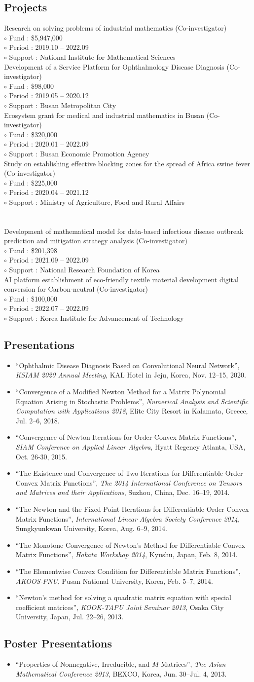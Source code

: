 \documentclass[11pt]{article} %
\newcommand\mypapers{
	
}
\newcommand\myprojseng{
	Research on solving problems of industrial mathematics (Co-investigator) \\
	$\circ$ Fund : \$5,947,000 \\
	$\circ$ Period : 2019.10 -- 2022.09 \\
	$\circ$ Support : National Institute for Mathematical Sciences \\
	
	Development of a Service Platform for Ophthalmology Disease Diagnosis (Co-investigator) \\
	$\circ$ Fund : \$98,000 \\
	$\circ$ Period : 2019.05 -- 2020.12 \\
	$\circ$ Support : Busan Metropolitan City \\
	
	Ecosystem grant for medical and industrial mathematics in Busan (Co-investigator) \\
	$\circ$ Fund : \$320,000 \\
	$\circ$ Period : 2020.01 -- 2022.09 \\
	$\circ$ Support : Busan Economic Promotion Agency \\
	
	Study on establishing effective blocking zones for the spread of Africa swine fever (Co-investigator) \\
	$\circ$ Fund : \$225,000 \\
	$\circ$ Period : 2020.04 -- 2021.12 \\
	$\circ$ Support : Ministry of Agriculture, Food and Rural Affairs \\
	~\\~\\
	
	Development of mathematical model for data-based infectious disease outbreak prediction and mitigation strategy analysis (Co-investigator) \\
	$\circ$ Fund : \$201,398 \\
	$\circ$ Period : 2021.09 -- 2022.09 \\
	$\circ$ Support : National Research Foundation of Korea \\
	
	AI platform establishment of eco-friendly textile material development digital conversion for Carbon-neutral (Co-investigator) \\
	$\circ$ Fund : \$100,000 \\
	$\circ$ Period : 2022.07 -- 2022.09 \\
	$\circ$ Support : Korea Institute for Advancement of Technology
}
\newcommand\mypresent{
	\begin{itemize}[leftmargin=*]
		\item ``Ophthalmic Disease Diagnosis Based on Convolutional Neural Network'', {\it KSIAM 2020 Annual Meeting}, KAL Hotel in Jeju, Korea, Nov. 12--15, 2020.
		\item ``Convergence of a Modified Newton Method for a Matrix Polynomial Equation Arising in Stochastic Problems'', {\it Numerical Analysis and Scientific Computation with Applications 2018}, Elite City Resort in Kalamata, Greece, Jul. 2--6, 2018.
		\item ``Convergence of Newton Iterations for Order-Convex Matrix Functions'', {\it SIAM Conference on Applied Linear Algebra}, Hyatt Regency Atlanta, USA, Oct. 26-30, 2015.
		\item ``The Existence and Convergence of Two Iterations for Differentiable Order-Convex Matrix Functions'', {\it The 2014 International Conference on Tensors and Matrices and their Applications}, Suzhou, China, Dec. 16--19, 2014.
		\item ``The Newton and the Fixed Point Iterations for Differentiable Order-Convex Matrix Functions'', {\it International Linear Algebra Society Conference 2014}, Sungkyunkwan University, Korea, Aug. 6--9, 2014.
		\item ``The Monotone Convergence of Newton’s Method for Differentiable Convex Matrix Functions'', {\it Hakata Workshop 2014}, Kyushu, Japan, Feb. 8, 2014.
		\item ``The Elementwise Convex Condition for Differentiable Matrix Functions'', {\it AKOOS-PNU}, Pusan National University, Korea, Feb. 5--7, 2014.
		\item ``Newton’s method for solving a quadratic matrix equation with special coefficient matrices'', {\it KOOK-TAPU Joint Seminar 2013}, Osaka City University, Japan, Jul. 22--26, 2013.
		
	\end{itemize}
}
\newcommand\myposter{
	\begin{itemize}[leftmargin=*]
		\item ``Properties of Nonnegative, Irreducible, and $M$-Matrices'', {\it The Asian Mathematical Conference 2013}, BEXCO, Korea, Jun. 30--Jul. 4, 2013.
	\end{itemize}
}
\begin{document}
\mypapers


\subsection*{Projects}
\myprojseng


\subsection*{Presentations}
\renewcommand\labelitemi{\tiny$\bullet$}
\mypresent

\subsection*{Poster Presentations}
\myposter


%
%
%
%
%
%
%
\fi
\end{document}

